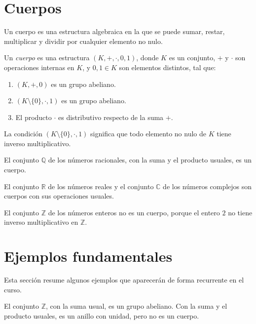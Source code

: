 \section{Cuerpos}

Un cuerpo es una estructura algebraica en la que se puede sumar, restar, multiplicar y dividir por cualquier elemento no nulo.

\begin{definicion}[Cuerpo]
Un \emph{cuerpo} es una estructura \((K,+,\cdot,0,1)\), donde \(K\) es un conjunto, \(+\) y \(\cdot\) son operaciones internas en \(K\), y \(0,1\in K\) son elementos distintos, tal que:
\begin{enumerate}
  \item \((K,+,0)\) es un grupo abeliano.
  \item \((K\setminus\{0\},\cdot,1)\) es un grupo abeliano.
  \item El producto \(\cdot\) es distributivo respecto de la suma \(+\).
\end{enumerate}
\end{definicion}

La condición \((K\setminus\{0\},\cdot,1)\) significa que todo elemento no nulo de \(K\) tiene inverso multiplicativo.

\begin{ejemplo}
El conjunto \(\mathbb{Q}\) de los números racionales, con la suma y el producto usuales, es un cuerpo.
\end{ejemplo}

\begin{ejemplo}
El conjunto \(\mathbb{R}\) de los números reales y el conjunto \(\mathbb{C}\) de los números complejos son cuerpos con sus operaciones usuales.
\end{ejemplo}

\begin{contraejemplo}
El conjunto \(\mathbb{Z}\) de los números enteros no es un cuerpo, porque el entero \(2\) no tiene inverso multiplicativo en \(\mathbb{Z}\).
\end{contraejemplo}

\section{Ejemplos fundamentales}

Esta sección resume algunos ejemplos que aparecerán de forma recurrente en el curso.

\begin{ejemplo}
El conjunto \(\mathbb{Z}\), con la suma usual, es un grupo abeliano. Con la suma y el producto usuales, es un anillo con unidad, pero no es un cuerpo.
\end{ejemplo}

